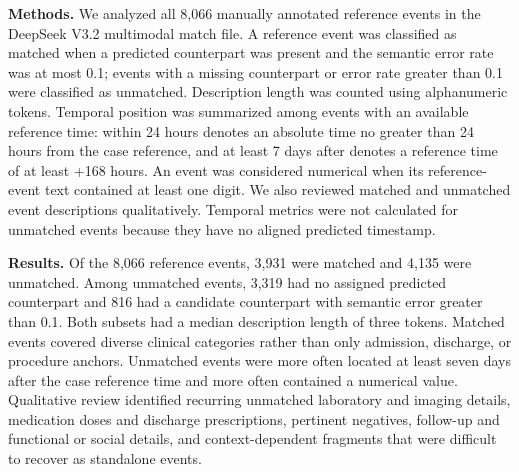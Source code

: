 \vspace{2mm}
\noindent
\textbf{Methods.} We analyzed all 8,066 manually annotated reference events in the DeepSeek V3.2 multimodal match file. A reference event was classified as matched when a predicted counterpart was present and the semantic error rate was at most 0.1; events with a missing counterpart or error rate greater than 0.1 were classified as unmatched. Description length was counted using alphanumeric tokens. Temporal position was summarized among events with an available reference time: within 24 hours denotes an absolute time no greater than 24 hours from the case reference, and at least 7 days after denotes a reference time of at least +168 hours. An event was considered numerical when its reference-event text contained at least one digit. We also reviewed matched and unmatched event descriptions qualitatively. Temporal metrics were not calculated for unmatched events because they have no aligned predicted timestamp.

\vspace{2mm}
\noindent
\textbf{Results.} Of the 8,066 reference events, 3,931 were matched and 4,135 were unmatched. Among unmatched events, 3,319 had no assigned predicted counterpart and 816 had a candidate counterpart with semantic error greater than 0.1. Both subsets had a median description length of three tokens. Matched events covered diverse clinical categories rather than only admission, discharge, or procedure anchors. Unmatched events were more often located at least seven days after the case reference time and more often contained a numerical value. Qualitative review identified recurring unmatched laboratory and imaging details, medication doses and discharge prescriptions, pertinent negatives, follow-up and functional or social details, and context-dependent fragments that were difficult to recover as standalone events.

